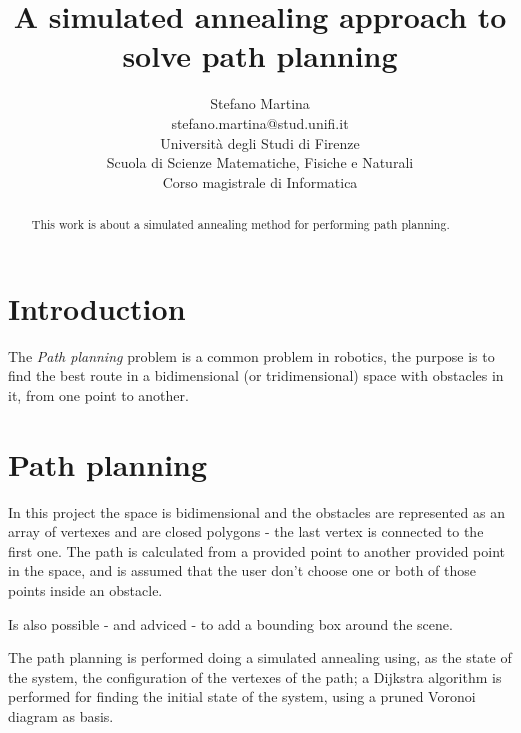 \documentclass[a4paper]{article}
\author{
  {\Large Stefano Martina}\\
  {\small stefano.martina@stud.unifi.it}\\
  Universit\`a degli Studi di Firenze\\
  Scuola di Scienze Matematiche, Fisiche e Naturali\\
  Corso magistrale di Informatica
}
\title{{\Huge\bfseries A simulated annealing approach to solve path
    planning}}%
\begin{document}
\maketitle
\thispagestyle{empty}
\vfill
\begin{abstract}
  This work is about a simulated annealing method for performing path
  planning.
\end{abstract}

\section{Introduction}
The \emph{Path planning} problem is a common problem in robotics, the
purpose is to find the best route in a bidimensional (or
tridimensional) space with obstacles in it, from one point to
another.

\section{Path planning}
In this project the space is bidimensional and the obstacles are
represented as an array of vertexes and are closed polygons - the last
vertex is connected to the first one. The path is calculated from a
provided point to another provided point in the space, and is assumed
that the user don't choose one or both of those points inside an
obstacle.

Is also possible - and adviced - to add a bounding box around the
scene.

The path planning is performed doing a simulated annealing using, as the state of the system, the
configuration of the vertexes of the path; a Dijkstra algorithm is
performed for finding the initial state of the system, using a pruned 
Voronoi diagram as basis.
\end{document}
